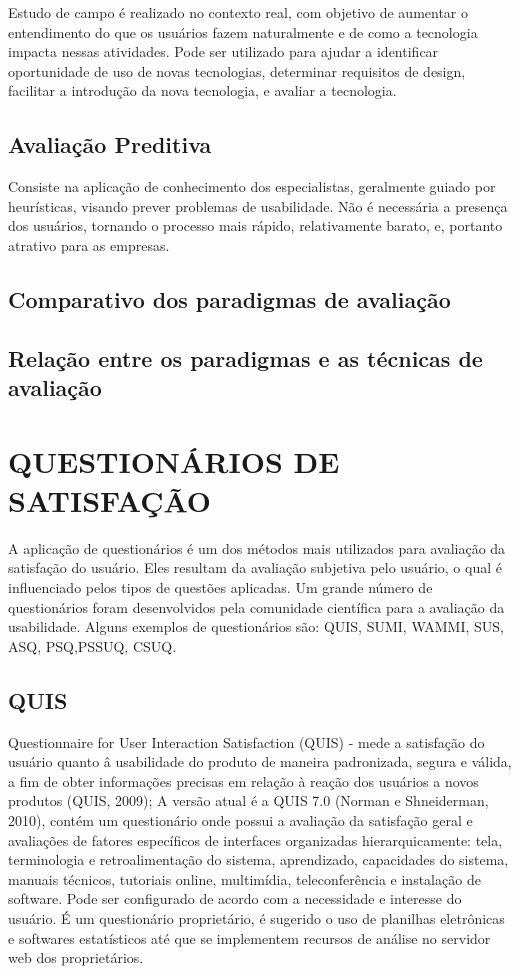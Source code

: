 Estudo de campo é realizado no contexto real, com objetivo de aumentar o entendimento do que os usuários fazem naturalmente e de como a tecnologia impacta nessas atividades. Pode ser utilizado para ajudar a identificar oportunidade de uso de novas tecnologias, determinar requisitos de design, facilitar a introdução da nova tecnologia, e avaliar a tecnologia.

\subsection{Avaliação Preditiva}

Consiste na aplicação de conhecimento dos especialistas, geralmente guiado por heurísticas, visando prever problemas de usabilidade. Não é necessária a presença dos usuários, tornando o processo mais rápido, relativamente barato, e, portanto atrativo para as empresas.


\subsection{Comparativo dos paradigmas de avaliação}

\subsection{Relação entre os paradigmas e as técnicas de avaliação}


\section{QUESTIONÁRIOS DE SATISFAÇÃO}

A aplicação de questionários é um dos métodos mais utilizados para avaliação da satisfação do usuário. Eles resultam da avaliação subjetiva pelo usuário, o qual é influenciado pelos tipos de questões aplicadas.
Um grande número de questionários foram desenvolvidos pela comunidade científica para a avaliação da usabilidade.  Alguns exemplos de questionários são: QUIS, SUMI,  WAMMI, SUS, ASQ, PSQ,PSSUQ, CSUQ. 

\subsection{QUIS}

	Questionnaire for User Interaction Satisfaction (QUIS) - mede a satisfação do usuário quanto â usabilidade do produto de maneira padronizada, segura e válida, a fim de obter informações precisas em relação à reação dos usuários a novos produtos (QUIS, 2009);
	A versão atual é a QUIS 7.0 (Norman e Shneiderman, 2010), contém um questionário onde possui a avaliação da satisfação geral e avaliações de fatores específicos de interfaces organizadas hierarquicamente: tela, terminologia e retroalimentação do sistema, aprendizado, capacidades do sistema, manuais técnicos, tutoriais online, multimídia, teleconferência e instalação de software. Pode ser configurado de acordo com a necessidade e interesse do usuário. 
	É um questionário proprietário, é sugerido o uso de planilhas eletrônicas e softwares estatísticos até que se implementem recursos de análise no servidor web dos proprietários.
	
